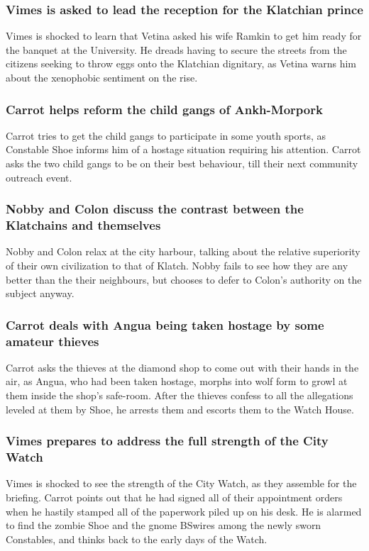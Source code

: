 \subsubsection{\Gls{Vimes} is asked to lead the reception for the Klatchian prince}
\Gls{Vimes} is shocked to learn that \Gls{Vetina} asked his wife \Gls{Ramkin} to get him ready
for the banquet at the University. He dreads having to secure the streets from the citizens seeking
to throw eggs onto the Klatchian dignitary, as \Gls{Vetina} warns him about the xenophobic sentiment
on the rise.

\subsubsection{\Gls{Carrot} helps reform the child gangs of Ankh-Morpork}
\Gls{Carrot} tries to get the child gangs to participate in some youth sports, as Constable
\Gls{Shoe} informs him of a hostage situation requiring his attention. \Gls{Carrot} asks the two
child gangs to be on their best behaviour, till their next community outreach event.

\subsubsection{\Gls{Nobby} and \Gls{Colon} discuss the contrast between the Klatchains and
    themselves}
\Gls{Nobby} and \Gls{Colon} relax at the city harbour, talking about the relative superiority of
their own civilization to that of Klatch. \Gls{Nobby} fails to see how they are any better than the
their neighbours, but chooses to defer to \Gls{Colon}'s authority on the subject anyway.

\subsubsection{\Gls{Carrot} deals with \Gls{Angua} being taken hostage by some amateur thieves}
\Gls{Carrot} asks the thieves at the diamond shop to come out with their hands in the air, as
\Gls{Angua}, who had been taken hostage, morphs into wolf form to growl at them inside the shop's
safe-room. After the thieves confess to all the allegations leveled at them by \Gls{Shoe}, he
arrests them and escorts them to the Watch House.

\subsubsection{\Gls{Vimes} prepares to address the full strength of the City Watch}
\Gls{Vimes} is shocked to see the strength of the City Watch, as they assemble for the briefing.
\Gls{Carrot} points out that he had signed all of their appointment orders when he hastily
stamped all of the paperwork piled up on his desk. He is alarmed to find the zombie \Gls{Shoe} and
the gnome \Gls{BSwires} among the newly sworn Constables, and thinks back to the early days of the
Watch.

